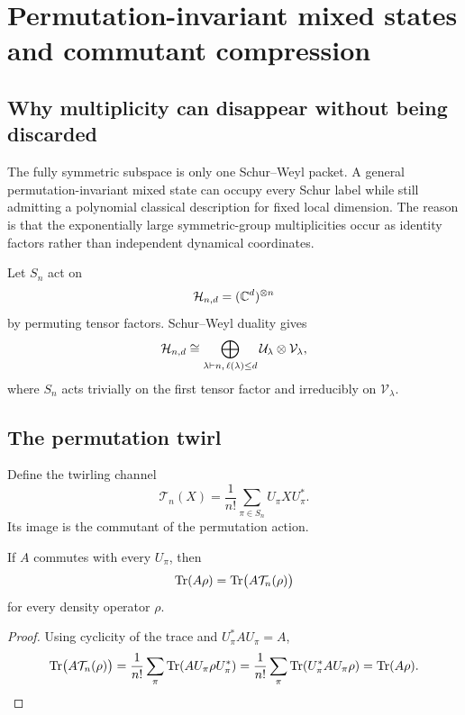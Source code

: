 \section{Permutation-invariant mixed states and commutant compression}
\label{s:ch:commutant-collapse}

\subsection{Why multiplicity can disappear without being discarded}
The fully symmetric subspace is only one Schur--Weyl packet. A general permutation-invariant mixed state can occupy every Schur label while still admitting a polynomial classical description for fixed local dimension. The reason is that the exponentially large symmetric-group multiplicities occur as identity factors rather than independent dynamical coordinates.

Let $S_n$ act on
\[
\mathcal H_{n,d}=(\mathbb C^d)^{\otimes n}
\]
by permuting tensor factors. Schur--Weyl duality gives
\begin{equation}
\mathcal H_{n,d}
\cong
\bigoplus_{\lambda\vdash n,\,\ell(\lambda)\le d}
\mathcal U_\lambda\otimes\mathcal V_\lambda,
\label{s:eq:schur-decomp-commutant}
\end{equation}
where $S_n$ acts trivially on the first tensor factor and irreducibly on $\mathcal V_\lambda$.

\subsection{The permutation twirl}
Define the twirling channel
\begin{equation}
\mathcal T_n(X)
=
\frac1{n!}
\sum_{\pi\in S_n}
U_\pi XU_\pi^*.
\label{s:eq:permutation-twirl}
\end{equation}
Its image is the commutant of the permutation action.

\begin{lemma}
\label{s:lem:twirl-observable}
If $A$ commutes with every $U_\pi$, then
\[
\operatorname{Tr}(A\rho)
=
\operatorname{Tr}\bigl(A\mathcal T_n(\rho)\bigr)
\]
for every density operator $\rho$.
\end{lemma}

\begin{proof}
Using cyclicity of the trace and $U_\pi^*AU_\pi=A$,
\[
\operatorname{Tr}\bigl(A\mathcal T_n(\rho)\bigr)
=
\frac1{n!}\sum_\pi
\operatorname{Tr}(AU_\pi\rho U_\pi^*)
=
\frac1{n!}\sum_\pi
\operatorname{Tr}(U_\pi^*AU_\pi\rho)
=
\operatorname{Tr}(A\rho).
\]
\end{proof}

